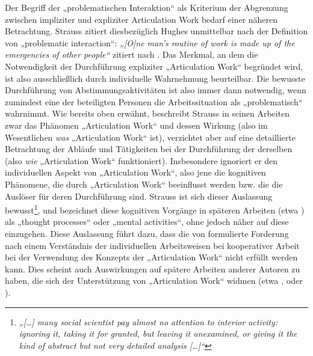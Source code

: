 Der Begriff der „problematischen Interaktion“ als Kriterium der Abgrenzung zwischen impliziter und expliziter Articulation Work bedarf einer näheren Betrachtung. Strauss zitiert diesbezüglich Hughes unmittelbar nach der Definition von „problematic interaction“: \emph{„[O]ne man's routine of work is made up of the emergencies of other people“} \citep{Hughes71} zitiert nach \citep{Strauss93}. Das Merkmal, an dem die Notwendigkeit der Durchführung expliziter „Articulation Work“ begründet wird, ist also ausschließlich durch individuelle Wahrnehmung beurteilbar. Die bewusste Durchführung von Abstimmungsaktivitäten ist also immer dann notwendig, wenn zumindest eine der beteiligten Personen die Arbeitssituation als „problematisch“ wahrnimmt. Wie bereits oben erwähnt, beschreibt Strauss in seinen Arbeiten zwar das Phänomen „Articulation Work“ und dessen Wirkung (also im Wesentlichen \emph{was} „Articulation Work“ ist), verzichtet aber auf eine detaillierte Betrachtung der Abläufe und Tätigkeiten bei der Durchführung der derselben (also \emph{wie} „Articulation Work“ funktioniert). Insbesondere ignoriert er den individuellen Aspekt von „Articulation Work“, also jene die kognitiven Phänomene, die durch „Articulation Work“ beeinflusst werden bzw. die die Auslöser für deren Durchführung sind. Strauss ist sich dieser Auslassung bewusst\footnote{\emph{„[\ldots] many social scientist pay almost no attention to interior activity: ignoring it, taking it for granted, but leaving it unexamined, or giving it the kind of abstract but not very detailed analysis [\ldots]“}\citep[][S. 131]{Strauss93}}, und bezeichnet diese kognitiven Vorgänge in späteren Arbeiten (etwa \citep{Strauss93})  als „thought processes“ oder „mental activities“, ohne jedoch näher auf diese einzugehen. Diese Auslassung führt dazu, dass die von \citet{Grudin88} formulierte Forderung nach einem Verständnis der individuellen Arbeitsweisen bei kooperativer Arbeit bei der Verwendung des Konzepts der „Articulation Work“ nicht erfüllt werden kann. Dies scheint auch Auswirkungen auf spätere Arbeiten anderer Autoren zu haben, die sich der Unterstützung von „Articulation Work“ widmen (etwa \citet{Schmidt92}, \citet{Simone99} oder \citet{Baker07}).

